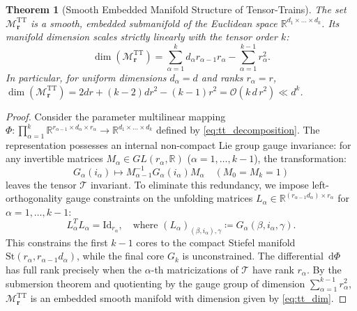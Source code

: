 \documentclass[11pt,a4paper,reqno]{amsart}
\newtheorem{theorem}{Theorem}[section]
\theoremstyle{definition}
\numberwithin{equation}{section}
\newcommand{\R}{\mathbb{R}}
\newcommand{\Id}{\mathrm{Id}}
\newcommand{\dif}{\,\mathrm{d}}
\begin{document}
\begin{theorem}[Smooth Embedded Manifold Structure of Tensor-Trains]
\label{thm:tt_manifold}
The set $\mathcal{M}_{\mathbf{r}}^{\mathrm{TT}}$ is a smooth, embedded submanifold of the Euclidean space $\R^{d_1 \times \dots \times d_k}$. Its manifold dimension scales strictly linearly with the tensor order $k$:
\begin{equation}
    \label{eq:tt_dim}
    \dim(\mathcal{M}_{\mathbf{r}}^{\mathrm{TT}}) = \sum_{\alpha=1}^k d_\alpha r_{\alpha-1} r_\alpha - \sum_{\alpha=1}^{k-1} r_\alpha^2.
\end{equation}
In particular, for uniform dimensions $d_\alpha = d$ and ranks $r_\alpha = r$, $\dim(\mathcal{M}_{\mathbf{r}}^{\mathrm{TT}}) = 2 d r + (k-2) d r^2 - (k-1) r^2 = \mathcal{O}(k \, d \, r^2) \ll d^k$.
\end{theorem}
\begin{proof}
Consider the parameter multilinear mapping $\Phi \colon \prod_{\alpha=1}^k \R^{r_{\alpha-1} \times d_\alpha \times r_\alpha} \to \R^{d_1 \times \dots \times d_k}$ defined by \eqref{eq:tt_decomposition}. The representation possesses an internal non-compact Lie group gauge invariance: for any invertible matrices $M_\alpha \in GL(r_\alpha, \R)$ ($\alpha = 1, \dots, k-1$), the transformation:
\begin{equation}
    \label{eq:tt_gauge_transformation}
    G_\alpha(i_\alpha) \mapsto M_{\alpha-1}^{-1} G_\alpha(i_\alpha) M_\alpha \quad (M_0 = M_k = 1)
\end{equation}
leaves the tensor $\mathcal{T}$ invariant. To eliminate this redundancy, we impose left-orthogonality gauge constraints on the unfolding matrices $L_\alpha \in \R^{(r_{\alpha-1} d_\alpha) \times r_\alpha}$ for $\alpha = 1, \dots, k-1$:
\begin{equation}
    L_\alpha^T L_\alpha = \Id_{r_\alpha}, \quad \text{where } (L_\alpha)_{(\beta, i_\alpha), \gamma} \coloneqq G_\alpha(\beta, i_\alpha, \gamma).
\end{equation}
This constrains the first $k-1$ cores to the compact Stiefel manifold $\mathrm{St}(r_\alpha, r_{\alpha-1} d_\alpha)$, while the final core $G_k$ is unconstrained. The differential $\dif \Phi$ has full rank precisely when the $\alpha$-th matricizations of $\mathcal{T}$ have rank $r_\alpha$. By the submersion theorem and quotienting by the gauge group of dimension $\sum_{\alpha=1}^{k-1} r_\alpha^2$, $\mathcal{M}_{\mathbf{r}}^{\mathrm{TT}}$ is an embedded smooth manifold with dimension given by \eqref{eq:tt_dim}.
\end{proof}
\end{document}
